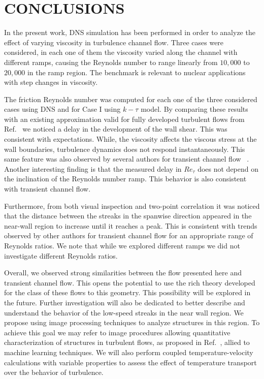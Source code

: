 \documentclass[twocolumn,10pt]{asme2e}
\begin{document}
\section*{CONCLUSIONS}

In the present work, DNS simulation has been performed in order to analyze the effect of varying viscosity in turbulence channel flow. Three cases were considered, in each one of them the viscosity varied along the channel with different ramps, causing the Reynolds number to range linearly from \(10,000\) to \(20,000\) in the ramp region. The benchmark is relevant to nuclear applications with step changes in viscosity.

The friction Reynolds number was computed for each one of the three considered cases using DNS and for Case I using \(k-\tau\) model. By comparing these results with an existing approximation valid for fully developed turbulent flows from Ref.~\cite{pope} we noticed a delay in the development of the wall shear. This was consistent with expectations. While, the viscosity affects the viscous stress at the wall boundaries, turbulence dynamics does not respond instantaneously. This same feature was also observed by several authors for transient channel flow ~\cite{maruyama1976,he2000,greenblatt2004,he2015}. Another interesting finding is that the measured delay in \(Re_{\tau}\) does not depend on the inclination of the Reynolds number ramp. This behavior is also consistent with transient channel flow.

Furthermore, from both visual inspection and two-point correlation it was noticed that the distance between the streaks in the spanwise direction appeared in the near-wall region to increase until it reaches a peak. This is consistent with trends observed by other authors for transient channel flow for an appropriate range of Reynolds ratios. We note that while we explored different ramps we did not investigate different Reynolds ratios.

Overall, we observed strong similarities between the flow presented here and transient channel flow. This opens the potential to use the rich theory developed for the class of these flows to this geometry. This possibility will be explored in the future.  Further investigation will also be dedicated to better describe and understand the behavior of the low-speed streaks in the near wall region. We propose using image processing techniques to analyze structures in this region. To achieve this goal we may refer to image procedures allowing quantitative characterization of structures in turbulent flows, as proposed in Ref.~\cite{lin2008}, allied to machine learning techniques. We will also  perform coupled temperature-velocity calculations with variable properties to assess the effect of temperature transport over the behavior of turbulence.
\end{document}
